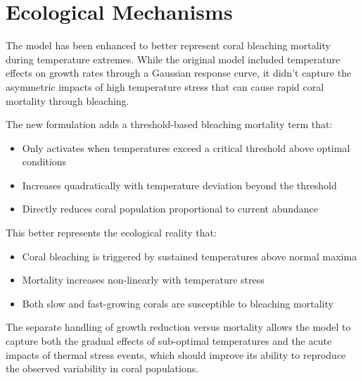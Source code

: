\section{Ecological Mechanisms}

The model has been enhanced to better represent coral bleaching mortality during temperature extremes. While the original model included temperature effects on growth rates through a Gaussian response curve, it didn't capture the asymmetric impacts of high temperature stress that can cause rapid coral mortality through bleaching.

The new formulation adds a threshold-based bleaching mortality term that:
\begin{itemize}
    \item Only activates when temperatures exceed a critical threshold above optimal conditions
    \item Increases quadratically with temperature deviation beyond the threshold
    \item Directly reduces coral population proportional to current abundance
\end{itemize}

This better represents the ecological reality that:
\begin{itemize}
    \item Coral bleaching is triggered by sustained temperatures above normal maxima
    \item Mortality increases non-linearly with temperature stress
    \item Both slow and fast-growing corals are susceptible to bleaching mortality
\end{itemize}

The separate handling of growth reduction versus mortality allows the model to capture both the gradual effects of sub-optimal temperatures and the acute impacts of thermal stress events, which should improve its ability to reproduce the observed variability in coral populations.
